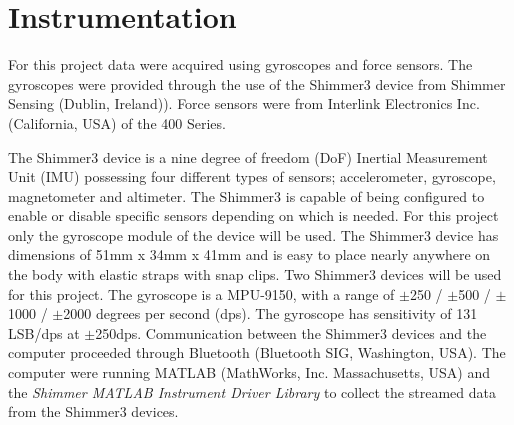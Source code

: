 \section{Instrumentation} \label{methods:instrumentation}

For this project data were acquired using gyroscopes and force sensors. The gyroscopes were provided through the use of the Shimmer3 device from Shimmer Sensing (Dublin, Ireland)). Force sensors were from Interlink Electronics Inc. (California, USA) of the 400 Series. %

The Shimmer3 device is a nine degree of freedom (DoF) Inertial Measurement Unit (IMU) possessing four different types of sensors; accelerometer, gyroscope, magnetometer and altimeter. The Shimmer3 is capable of being configured to enable or disable specific sensors depending on which is needed. For this project only the gyroscope module of the device will be used. The Shimmer3 device has dimensions of 51mm x 34mm x 41mm and is easy to place nearly anywhere on the body with elastic straps with snap clips. Two Shimmer3 devices will be used for this project. %
The gyroscope is a MPU-9150, with a range of $\pm$250 / $\pm$500 / $\pm$1000 / $\pm$2000 degrees per second (dps). The gyroscope has sensitivity of 131 LSB/dps at $\pm$250dps. \cite{ShimmerSensing2016}
Communication between the Shimmer3 devices and the computer proceeded through Bluetooth (Bluetooth SIG, Washington, USA). The computer were running MATLAB (MathWorks, Inc. Massachusetts, USA) and the \textit{Shimmer MATLAB Instrument Driver Library} to collect the streamed data from the Shimmer3 devices.



